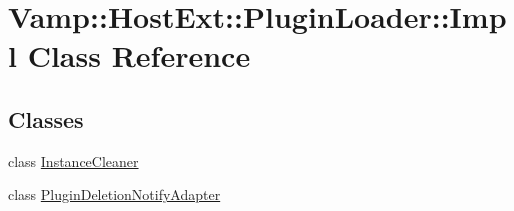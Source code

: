\hypertarget{class_vamp_1_1_host_ext_1_1_plugin_loader_1_1_impl}{}\section{Vamp\+:\+:Host\+Ext\+:\+:Plugin\+Loader\+:\+:Impl Class Reference}
\label{class_vamp_1_1_host_ext_1_1_plugin_loader_1_1_impl}
\subsection*{Classes}
\begin{DoxyCompactItemize}
\item 
class \hyperlink{class_vamp_1_1_host_ext_1_1_plugin_loader_1_1_impl_1_1_instance_cleaner}{Instance\+Cleaner}
\item 
class \hyperlink{class_vamp_1_1_host_ext_1_1_plugin_loader_1_1_impl_1_1_plugin_deletion_notify_adapter}{Plugin\+Deletion\+Notify\+Adapter}
\end{DoxyCompactItemize}
